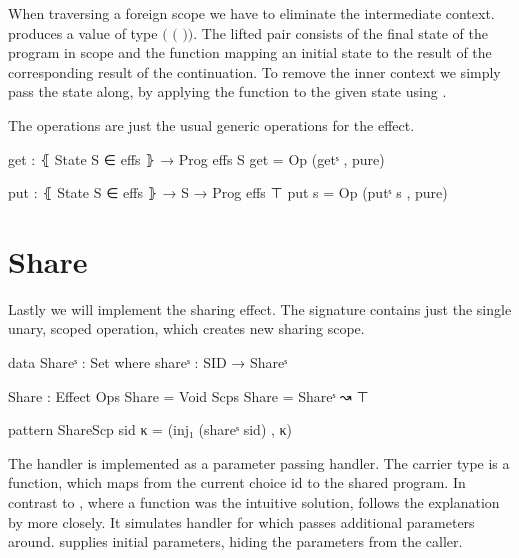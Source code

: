 When traversing a foreign scope we have to eliminate the intermediate context.
 produces a value of type
\AgdaSpace{}\AgdaSpace{}$($%
\AgdaSpace{}\AgdaSpace{}$($%
\AgdaSpace{}\AgdaSpace{}%
\AgdaSpace{}\AgdaSpace{}$)$$)$.
The lifted pair consists of the final state of the program in scope and the
function mapping an initial state to the result of the corresponding result of
the continuation.
To remove the inner context we simply pass the state along, by applying the
function to the given state using .

The operations are just the usual generic operations for the effect.

\begin{code}
get : ⦃ State S ∈ effs ⦄ → Prog effs S
get = Op (getˢ , pure)

put : ⦃ State S ∈ effs ⦄ → S → Prog effs ⊤
put s = Op (putˢ s , pure)
\end{code}


\section{Share}

Lastly we will implement the sharing effect.
The signature contains just the single unary, scoped operation, 
which creates new sharing scope.

\begin{code}
data Shareˢ : Set where shareˢ : SID → Shareˢ

Share : Effect
Ops   Share = Void
Scps  Share = Shareˢ ↝ ⊤

pattern ShareScp sid κ = (inj₁ (shareˢ sid) , κ)
\end{code}
The handler is implemented as a parameter passing handler.
The carrier type is a function, which maps from the current choice id to the
shared program.
In contrast to , where a function was the intuitive solution,
 follows the explanation by
\textcite{DBLP:conf/esop/PlotkinP09} more closely.
It simulates handler for  which passes additional parameters
around.
 supplies initial parameters, hiding the parameters from
the caller.

